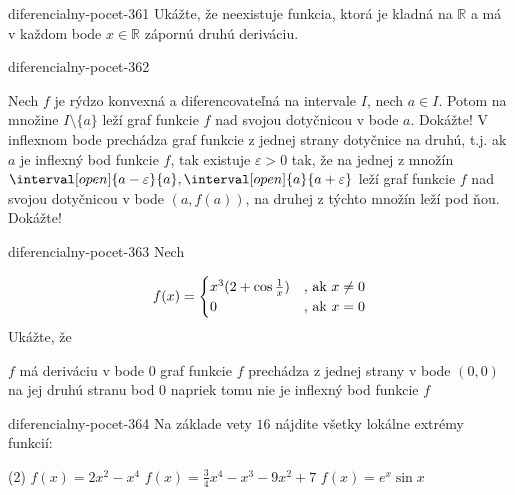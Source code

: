 \begin{defproblem}{diferencialny-pocet-361}
Ukážte, že neexistuje funkcia, ktorá je kladná na $\mathbb{R}$ a má v každom
bode $x\in\mathbb{R}$ zápornú druhú deriváciu.
\end{defproblem}

\begin{defproblem}{diferencialny-pocet-362}
\begin{tasks}
\task
  Nech $f$ je rýdzo konvexná a diferencovateľná na intervale $I$, nech $a\in I$.
  Potom na množine $I\setminus \{a\}$ leží graf funkcie $f$ nad svojou
  dotyčnicou v bode $a$. Dokážte!
\task
  V inflexnom bode prechádza graf funkcie z jednej strany dotyčnice na druhú,
  t.j. ak $a$ je inflexný bod funkcie $f$, tak existuje $\varepsilon >0$ tak, že
  na jednej z množín $\interval[open]{a-\varepsilon}{a},\interval[open]{a}{a +
  \varepsilon}$ leží graf funkcie $f$ nad svojou dotyčnicou v bode $(a,f(a))$,
  na druhej z týchto množín leží pod ňou. Dokážte!
\end{tasks}
\end{defproblem}

\begin{defproblem}{diferencialny-pocet-363}
Nech

\[
  f(x)=
  \begin{cases}
    x^3(2+\cos \frac{1}{x}) & $, ak $ x \neq 0 \\
    0 &  $, ak $ x=0
  \end{cases}
\]
Ukážte, že
\begin{tasks}
  \task
    $f$ má deriváciu v bode $0$
  \task
    graf funkcie $f$ prechádza z jednej strany v bode $(0,0)$ na jej druhú
    stranu
  \task
    bod $0$ napriek tomu nie je inflexný bod funkcie $f$
\end{tasks}
\end{defproblem}

\begin{defproblem}{diferencialny-pocet-364}
Na základe vety $16$ nájdite  všetky lokálne extrémy funkcií:
\begin{tasks}(2)
  \task $f(x)=2x^2-x^4$
  \task $f(x)=\frac{3}{4}x^4-x^3-9x^2+7$
  \task $f(x)=e^x\sin x$
\end{tasks}
\end{defproblem}

